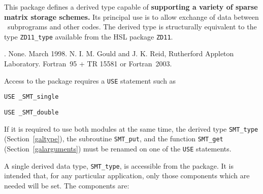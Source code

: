 \documentclass{galahad}
\newcommand{\packagename}{SMT}
\newcommand{\fullpackagename}{\libraryname\_\packagename}
\begin{document}
\galheader


\galsummary
This package defines a derived type capable of {\bf supporting 
a variety of sparse matrix storage schemes.} Its principal use is 
to allow exchange of data between \galahad\ subprograms  
and other codes. The derived type is structurally equivalent to 
the type {\tt ZD11\_type} available from the HSL package {\tt ZD11}.


\galattributes
\galversions{\tt  \fullpackagename\_single, \fullpackagename\_double}.
\galuses None.
\galdate March 1998.
\galorigin N. I. M. Gould and J. K. Reid, Rutherford Appleton Laboratory.
\gallanguage Fortran~95 + TR 15581 or Fortran~2003. 


\galhowto


Access to the package requires a {\tt USE} statement such as

\medskip{}

\hspace{8mm} {\tt USE \fullpackagename\_single}

\medskip{}

\hspace{8mm} {\tt USE  \fullpackagename\_double}

\medskip

\noindent
If it is required to use both modules at the same time, the derived type
{\tt \packagename\_type} 
(Section~\ref{galtype}),
the subroutine
{\tt \packagename\_put}, 
and the function
{\tt \packagename\_get} 
(Section~\ref{galarguments})
must be renamed on one of the {\tt USE} statements.


\galtype
A single derived data type, {\tt \packagename\_type},
is accessible from the package. It is intended that, for any particular
application, only those components which are needed will be set.
The components are:
\end{document}
